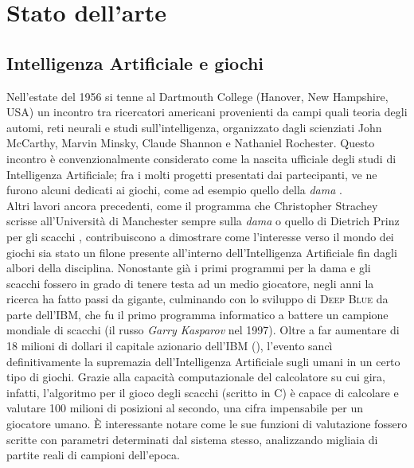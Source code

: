 \chapter*{Stato dell'arte}
\graphicspath{{Chapter2/Chapter2Figs/PNG/}{Chapter2/Chapter2Figs/PDF/}{Chapter2/Chapter2Figs/}}

\section{Intelligenza Artificiale e giochi}

Nell'estate del 1956 si tenne al Dartmouth College (Hanover, New Hampshire, USA) un incontro tra ricercatori americani provenienti da campi quali teoria degli automi, reti neurali e studi sull'intelligenza, organizzato dagli scienziati John McCarthy, Marvin Minsky, Claude Shannon e Nathaniel Rochester.
Questo incontro è convenzionalmente considerato come la nascita ufficiale degli studi di Intelligenza Artificiale; fra i molti progetti presentati dai partecipanti, ve ne furono alcuni dedicati ai giochi, come ad esempio quello della \emph{dama} \cite{randw}.\\
Altri lavori ancora precedenti, come il programma che Christopher Strachey scrisse all'Università di Manchester sempre sulla \emph{dama} o quello di Dietrich Prinz per gli scacchi \cite{historyofcomputing}, contribuiscono a dimostrare come l'interesse verso il mondo dei giochi sia stato un filone presente all'interno dell'Intelligenza Artificiale fin dagli albori della disciplina.
Nonostante già i primi programmi per la dama e gli scacchi fossero in grado di tenere testa ad un medio giocatore, negli anni la ricerca ha fatto passi da gigante, culminando con lo sviluppo di \textsc{Deep Blue} da parte dell'\textsc{IBM}, che fu il primo programma informatico a battere un campione mondiale di scacchi (il russo \emph{Garry Kasparov} nel 1997).
Oltre a far aumentare di 18 milioni di dollari il capitale azionario dell'\textsc{IBM} (\cite{randw}), l'evento sancì definitivamente la supremazia dell'Intelligenza Artificiale sugli umani in un certo tipo di giochi.
Grazie alla capacità computazionale del calcolatore su cui gira, infatti, l’algoritmo per il gioco degli scacchi (scritto in C) è capace di calcolare e valutare 100 milioni di posizioni al secondo, una cifra impensabile per un giocatore umano.
È interessante notare come le sue funzioni di valutazione fossero scritte con parametri determinati dal sistema stesso, analizzando migliaia di partite reali di campioni dell'epoca.\\
